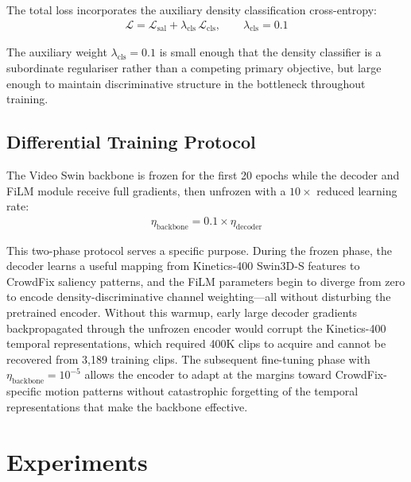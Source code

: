 \documentclass[twocolumn]{article}
\begin{document}
The total loss incorporates the auxiliary density classification cross-entropy:
\begin{align}
  \mathcal{L} = \mathcal{L}_\mathrm{sal}
  + \lambda_\mathrm{cls}\,\mathcal{L}_\mathrm{cls},
  \qquad \lambda_\mathrm{cls}\!=\!0.1
  \label{eq:total_loss}
\end{align}

The auxiliary weight $\lambda_\mathrm{cls}\!=\!0.1$ is small enough that
the density classifier is a subordinate regulariser rather than a competing
primary objective, but large enough to maintain discriminative structure
in the bottleneck throughout training.

\subsection{Differential Training Protocol}

The Video Swin backbone is frozen for the first 20 epochs while the decoder
and FiLM module receive full gradients, then unfrozen with a $10\times$
reduced learning rate:
\begin{align}
  \eta_\mathrm{backbone} = 0.1 \times \eta_\mathrm{decoder}
  \label{eq:diff_lr}
\end{align}

This two-phase protocol serves a specific purpose.  During the frozen phase,
the decoder learns a useful mapping from Kinetics-400 Swin3D-S features to
CrowdFix saliency patterns, and the FiLM parameters begin to diverge from
zero to encode density-discriminative channel weighting---all without
disturbing the pretrained encoder.  Without this warmup, early large decoder
gradients backpropagated through the unfrozen encoder would corrupt the
Kinetics-400 temporal representations, which required 400K clips to
acquire and cannot be recovered from 3,189 training clips.  The subsequent
fine-tuning phase with $\eta_\mathrm{backbone}\!=\!10^{-5}$ allows the
encoder to adapt at the margins toward CrowdFix-specific motion patterns
without catastrophic forgetting of the temporal representations that make
the backbone effective.

\section{Experiments}
\label{sec:experiments}
\end{document}
